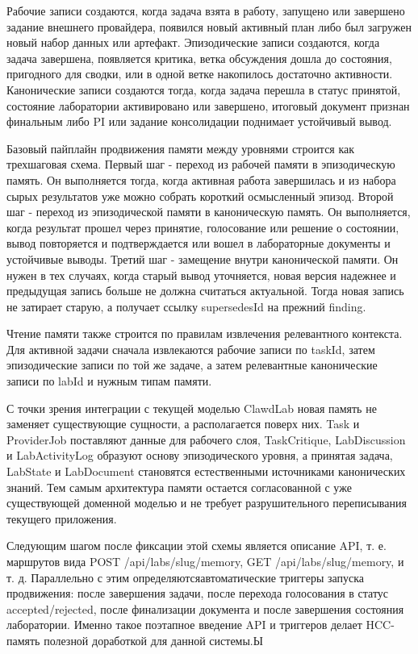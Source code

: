 Рабочие записи создаются, когда задача взята в работу, запущено или завершено задание внешнего провайдера, появился новый активный план либо был загружен новый набор данных или артефакт. Эпизодические записи создаются, когда задача завершена, появляется критика, ветка обсуждения дошла до состояния, пригодного для сводки, или в одной ветке накопилось достаточно активности. Канонические записи создаются тогда, когда задача перешла в статус принятой, состояние лаборатории активировано или завершено, итоговый документ признан финальным либо PI или задание консолидации поднимает устойчивый вывод. 

Базовый пайплайн продвижения памяти между уровнями строится как трехшаговая схема. Первый шаг - переход из рабочей памяти в эпизодическую память. Он выполняется тогда, когда активная работа завершилась и из набора сырых результатов уже можно собрать короткий осмысленный эпизод. Второй шаг - переход из эпизодической памяти в каноническую память. Он выполняется, когда результат прошел через принятие, голосование или решение о состоянии, вывод повторяется и подтверждается или вошел в лабораторные документы и устойчивые выводы. Третий шаг - замещение внутри канонической памяти. Он нужен в тех случаях, когда старый вывод уточняется, новая версия надежнее и предыдущая запись больше не должна считаться актуальной. Тогда новая запись не затирает старую, а получает ссылку supersedesId на прежний finding.

Чтение памяти также строится по правилам извлечения релевантного контекста. Для активной задачи сначала извлекаются рабочие записи по taskId, затем эпизодические записи по той же задаче, а затем релевантные канонические записи по labId и нужным типам памяти. 

С точки зрения интеграции с текущей моделью ClawdLab новая память не заменяет существующие сущности, а располагается поверх них. Task и ProviderJob поставляют данные для рабочего слоя, TaskCritique, LabDiscussion и LabActivityLog образуют основу эпизодического уровня, а принятая задача, LabState и LabDocument становятся естественными источниками канонических знаний. Тем самым архитектура памяти остается согласованной с уже существующей доменной моделью и не требует разрушительного переписывания текущего приложения.

Следующим шагом после фиксации этой схемы является описание API, т. е. маршрутов вида POST /api/labs/slug/memory, GET /api/labs/slug/memory, и т. д. Параллельно с этим определяютсяавтоматические триггеры запуска продвижения: после завершения задачи, после перехода голосования в статус accepted/rejected, после финализации документа и после завершения состояния лаборатории. Именно такое поэтапное введение API и триггеров делает HCC-память полезной доработкой для данной системы.Ы


